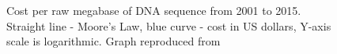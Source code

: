 \chapter[Appendix]{}
\vspace*{-0.3in}
\begin{figure}[hb!]
\begin{center}
\end{center}
\caption[Cost per raw megabase of DNA sequence from 2001 to 2015]{Cost per raw megabase of DNA sequence from 2001 to 2015. Straight line - Moore's Law, blue curve - cost in US dollars, Y-axis scale is logarithmic. Graph reproduced from \citep{wetterstrand2016}}
\end{figure}

